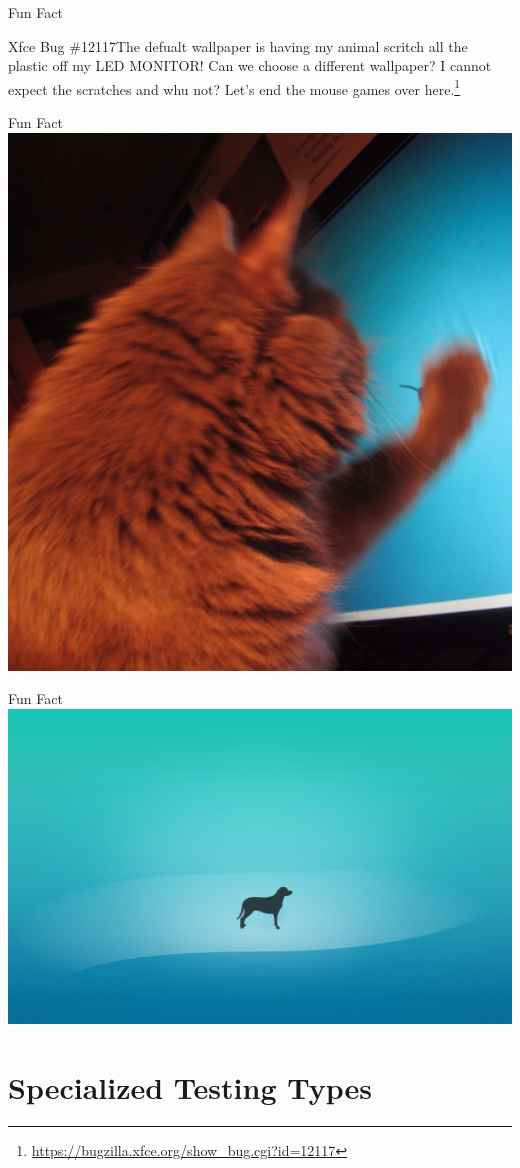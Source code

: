 \documentclass{beamer}
\begin{document}
\begin{frame}[t]{Fun Fact}
	\begin{block}
		{Xfce Bug \#12117}The defualt wallpaper is having my animal scritch all the plastic off my LED MONITOR! Can we choose a different wallpaper? I cannot expect the scratches and whu not? Let's end the mouse games over here.\footnote{\url{https://bugzilla.xfce.org/show_bug.cgi?id=12117}}
		
	\end{block}
	
\end{frame}
\begin{frame}[t]{Fun Fact}
	\centering
	\includegraphics[width=0.5\linewidth]{images/cat-xfce-bug-2.jpg}
	
\end{frame}
\begin{frame}[t]{Fun Fact}
	\includegraphics[width=0.8\linewidth]{images/patched-wallpaper.jpg}
	
\end{frame}
\section{Specialized Testing Types}
\end{document}
